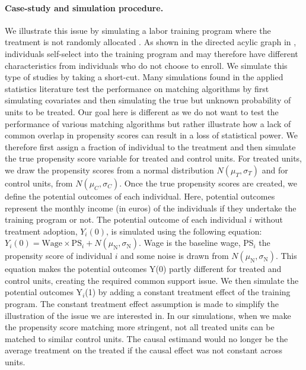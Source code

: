 \documentclass[12pt]{article}
\begin{document}
        \paragraph{Case-study and simulation procedure.} We illustrate this issue by simulating a labor training program where the treatment is not randomly allocated \citep{dehejia_causal_1999}. As shown in the directed acylic graph in , individuals self-select into the training program and may therefore have different characteristics from individuals who do not choose to enroll. We simulate this type of studies by taking a short-cut. Many simulations found in the applied statistics literature test the performance on matching algorithms by first simulating covariates and then simulating the true but unknown probability of units to be treated. Our goal here is different as we do not want to test the performance of various matching algorithms but rather illustrate how a lack of common overlap in propensity scores can result in a loss of statistical power. We therefore first assign a fraction of individual to the treatment and then simulate the true propensity score variable for treated and control units. For treated units, we draw the propensity scores from a normal distribution $N(\mu_T,\sigma_T)$ and for control units, from $N(\mu_C, \sigma_C)$. Once the true propensity scores are created, we define the potential outcomes of each individual. Here, potential outcomes represent the monthly income (in euros) of the individuals if they undertake the training program or not. The potential outcome of each individual $i$ without treatment adoption, $Y_{i}(0)$, is simulated using the following equation: $Y_i(0)=\text{Wage}\times\text{PS}_i+N(\mu_{\text{N}},\sigma_{\text{N}})$. Wage is the baseline wage, PS$_{i}$ the propensity score of individual $i$ and some noise is drawn from $N(\mu_{\text{N}},\sigma_{\text{N}})$. This equation makes the potential outcomes Y(0) partly different for treated and control units, creating the required common support issue. We then simulate the potential outcomes Y$_i$(1) by adding a constant treatment effect of the training program. The constant treatment effect assumption is made to simplify the illustration of the issue we are interested in. In our simulations, when we make the propensity score matching more stringent, not all treated units can be matched to similar control units. The causal estimand would no longer be the average treatment on the treated if the causal effect was not constant across units.  
        
\end{document}

